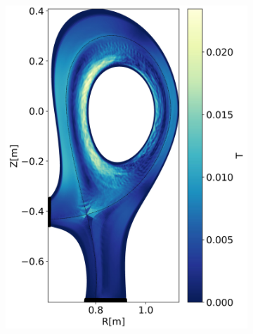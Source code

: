\begin{figure}[H]
\begin{subfigure}[t]{0.3\textwidth}
		\includegraphics[width=1\textwidth]{schemes/Hmode_BEM_noAverage.jpg}
		\label{fig:TCV_poloidalFieldGS_Btilde_fullA}
	\end{subfigure}
	\begin{subfigure}[t]{0.3\textwidth}
		\centering

\end{subfigure}
\end{figure}
